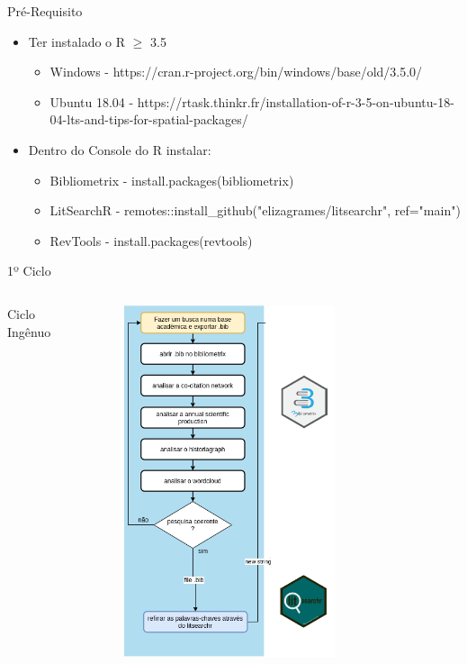 \begin{frame}{Pré-Requisito}
	\begin{itemize}
		\item Ter instalado o R $\geq$ 3.5
		\begin{itemize}
			\item Windows - https://cran.r-project.org/bin/windows/base/old/3.5.0/
			\item  Ubuntu 18.04 - https://rtask.thinkr.fr/installation-of-r-3-5-on-ubuntu-18-04-lts-and-tips-for-spatial-packages/
		\end{itemize}
		\item Dentro do Console do R instalar:
		\begin{itemize}
			\item Bibliometrix - install.packages(bibliometrix)
			\item LitSearchR - remotes::install\_github("elizagrames/litsearchr", ref="main")
			\item RevTools - install.packages(revtools)
		\end{itemize}
	\end{itemize}
\end{frame}

\begin{frame}{1º Ciclo}

	\begin{columns}
        Ciclo Ingênuo
		\begin{figure}[hb]
            \includegraphics[width=0.7\textwidth]{figures/ciclo1.png}
		\end{figure}
	\end{columns}
\end{frame}

